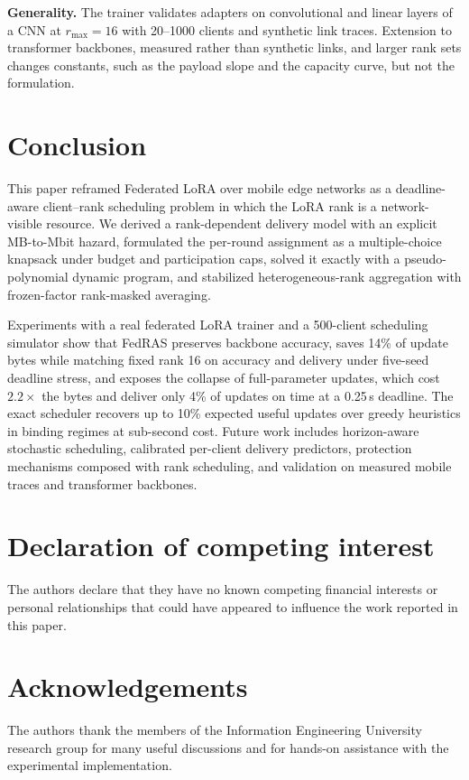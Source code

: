 \documentclass[preprint,12pt]{elsarticle}
\begin{document}
\textbf{Generality.} The trainer validates adapters on convolutional and linear layers of a CNN at $r_{\max}{=}16$ with 20--1000 clients and synthetic link traces. Extension to transformer backbones, measured rather than synthetic links, and larger rank sets changes constants, such as the payload slope and the capacity curve, but not the formulation.

\section{Conclusion}
\label{sec:conclusion}
This paper reframed Federated LoRA over mobile edge networks as a deadline-aware client--rank scheduling problem in which the LoRA rank is a network-visible resource. We derived a rank-dependent delivery model with an explicit MB-to-Mbit hazard, formulated the per-round assignment as a multiple-choice knapsack under budget and participation caps, solved it exactly with a pseudo-polynomial dynamic program, and stabilized heterogeneous-rank aggregation with frozen-factor rank-masked averaging.

Experiments with a real federated LoRA trainer and a 500-client scheduling simulator show that FedRAS preserves backbone accuracy, saves 14\% of update bytes while matching fixed rank 16 on accuracy and delivery under five-seed deadline stress, and exposes the collapse of full-parameter updates, which cost $2.2\times$ the bytes and deliver only 4\% of updates on time at a 0.25\,s deadline. The exact scheduler recovers up to 10\% expected useful updates over greedy heuristics in binding regimes at sub-second cost. Future work includes horizon-aware stochastic scheduling, calibrated per-client delivery predictors, protection mechanisms composed with rank scheduling, and validation on measured mobile traces and transformer backbones.

\section*{Declaration of competing interest}
The authors declare that they have no known competing financial interests or personal relationships that could have appeared to influence the work reported in this paper.

\section*{Acknowledgements}
The authors thank the members of the Information Engineering University research group for many useful discussions and for hands-on assistance with the experimental implementation.
\end{document}

